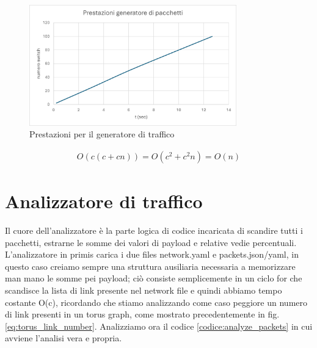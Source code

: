 \documentclass[binding=0.6cm]{sapthesis}
\begin{document}
\begin{figure}[h]
    \centering
    \includegraphics[width=0.8\textwidth]{immagini/prestazioni_config_gen.png}
    \caption{Prestazioni per il generatore di traffico}
    \label{fig:prestazioni_config_gen}
\end{figure}



\begin{align}
    O(c(c+cn)) = O(c^2 + c^2n) = O(n)
    \label{eq:complexity_traffic_generator}
\end{align}



\section{Analizzatore di traffico}
Il cuore dell'analizzatore è la parte logica di codice incaricata di scandire tutti i pacchetti, estrarne le somme dei valori di payload e relative vedie percentuali.
L'analizzatore in primis carica i due files network.yaml e packets.json/yaml, in questo caso creiamo sempre una struttura ausiliaria necessaria a memorizzare man mano le somme pei payload; ciò 
consiste semplicemente in un ciclo for che scandisce la lista di link presente nel network file e quindi abbiamo tempo costante O(c), ricordando che stiamo
analizzando come caso peggiore un numero di link presenti in un torus graph, come mostrato precedentemente in fig. \ref{eq:torus_link_number}.
Analizziamo ora il codice \ref{codice:analyze_packets} in cui avviene l'analisi vera e propria.
\end{document}
